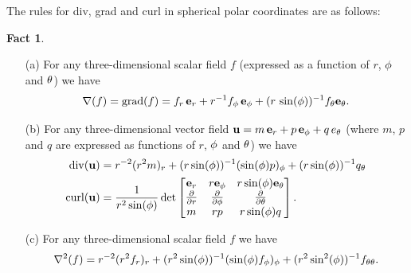 \documentclass[reqno]{amsart}
\theoremstyle{definition}
\newtheorem{fact}[theorem]{Fact}
\begin{document}
The rules for div, grad and curl in spherical polar
coordinates are as follows:

\begin{fact}\label{fact-polar-fields-sph}
 \begin{itemize}
  \item[(a)] For any three-dimensional scalar field $f$ (expressed as a
   function of $r$, $\phi$ and $\theta$) we have 
   \[ \nabla(f) = \operatorname{grad}(f) =
        f_r\,\mathbf{e}_r + r^{-1}f_\phi\,\mathbf{e}_\phi +
         (r\,\sin(\phi))^{-1}f_\theta\mathbf{e}_\theta.
   \]
  \item[(b)] For any three-dimensional vector field
   $\mathbf{u}=m\,\mathbf{e}_r+p\,\mathbf{e}_\phi+q\,e_\theta$ (where $m$, $p$ and $q$ are expressed as
   functions of $r$, $\phi$ and $\theta$) we have 
   \begin{align*}
    \operatorname{div}(\mathbf{u})
     &= r^{-2}(r^2m)_r + (r\sin(\phi))^{-1}(\sin(\phi)p)_\phi + 
         (r\sin(\phi))^{-1}q_\theta \\
    \operatorname{curl}(\mathbf{u})
     &= \frac{1}{r^2\sin(\phi)} \det\left[\begin{matrix}
          \mathbf{e}_r & r\mathbf{e}_\phi & r\sin(\phi)\mathbf{e}_\theta \\
          \frac{\partial}{\partial r}  & \frac{\partial}{\partial\phi}      & \frac{\partial}{\partial\theta}  \\
          m     & rp        & r\sin(\phi)q \end{matrix}\right].
   \end{align*}
  \item[(c)] For any three-dimensional scalar field $f$ we have 
   \[ \nabla^2(f) = 
      r^{-2}(r^2f_r)_r +
      (r^2\sin(\phi))^{-1}(\sin(\phi)f_\phi)_\phi + 
      (r^2\sin^2(\phi))^{-1} f_{\theta\theta}.
   \]
 \end{itemize}
\end{fact}
\end{document}
